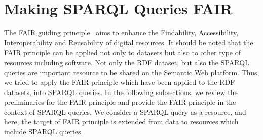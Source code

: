 \documentclass[runningheads]{llncs}
\begin{document}
\section{Making SPARQL Queries FAIR}

The FAIR guiding principle~\cite{fair} aims to enhance the Findability, Accessibility, Interoperability and Reusability of digital resources.
It should be noted that the FAIR principle can be applied not only to datasets but also to other type of resources including software.
Not only the RDF dataset, but also the SPARQL queries are important resource to be shared on the Semantic Web platform. Thus, we tried to apply the FAIR principle which have been applied to the RDF datasets, into SPARQL queries.
In the following subsections, we review the preliminaries for the FAIR principle
and provide the FAIR principle in the context of SPARQL queries.
We consider a SPARQL query as a resource,
and here, the target of FAIR principle is extended from data to resources which include SPARQL queries.




\end{document}
